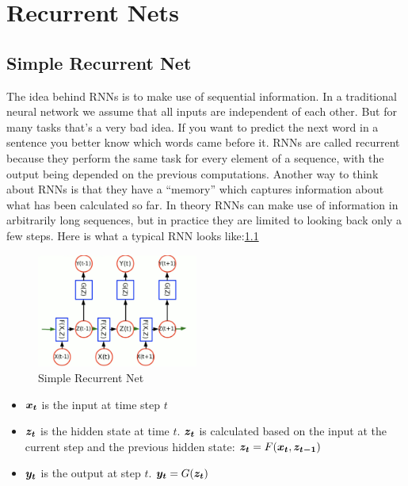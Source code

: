 \chapter{Recurrent Nets}

\section{Simple Recurrent Net}

The idea behind RNNs is to make use of sequential information. 
In a traditional neural network we assume that all inputs are independent of each other.
But for many tasks that’s a very bad idea. 
If you want to predict the next word in a sentence you better know which words came before it. 
RNNs are called recurrent because they perform the same task for every element of a sequence, with the output being depended on the previous computations. 
Another way to think about RNNs is that they have a “memory” which captures information about what has been calculated so far. 
In theory RNNs can make use of information in arbitrarily long sequences, but in practice they are limited to looking back only a few steps. 
Here is what a typical RNN looks like:\cref{fig:Simple RNN}

\begin{figure}[h]
    \centering
    \includegraphics[width=150pt]{lectures/06-b-rnn/image/rnn.png}
    \caption{Simple Recurrent Net}
    \label{fig:Simple RNN}
\end{figure}

\begin{itemize}
  \item $\vect{x_{t}}$ is the input at time step $t$
  \item $\vect{z_{t}}$ is the hidden state at time $t$. $\vect{z_{t}}$ is calculated based on the input at the current step and the previous hidden state:
  $\vect{z_t} = F(\vect{x_t}, \vect{z_{t-1}})$
  \item $\vect{y_t}$ is the output at step $t$. $\vect{y_t} = G(\vect{z_t})$
\end{itemize}



